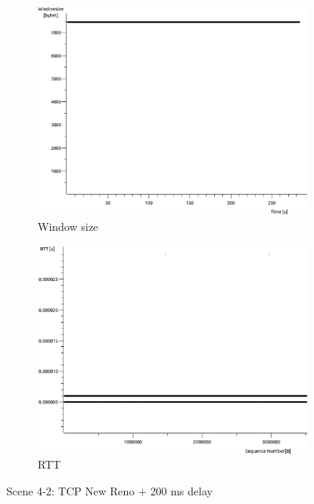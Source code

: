 \documentclass[conference,a4paper]{../../sty/IEEEtran}
\begin{document}
\begin{figure}
\begin{subfigure}[b]{0.2\textwidth}
  \includegraphics[width=\textwidth]{s4-2_wnd}
  \caption{Window size}
 \end{subfigure}
 \begin{subfigure}[b]{0.2\textwidth}
  \includegraphics[width=\textwidth]{s4-2_rtt}
  \caption{RTT}
 \end{subfigure}
 \caption{Scene 4-2: TCP New Reno + 200 ms delay}
\end{figure}
\end{document}
